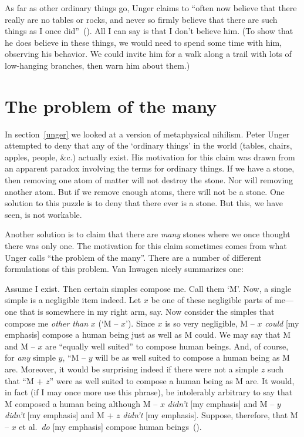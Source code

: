 \documentclass[11pt]{article}
\newenvironment{squote}{%
	\begin{spacing}{1}
	\begin{list}{}{%
	\setlength{\labelwidth}{0pt}%
	\rightmargin\leftmargin%
	}
	\item\relax
	}{%
	\end{list}%
	\end{spacing}
	}
\begin{document}
\begin{spacing}{1.5}
As far as other ordinary things go, Unger claims to ``often now believe that there really are no tables or rocks, and never so firmly believe that there are such things as I once did''~(\citeyear[543]{unger1980b}).  All I can say is that I don't believe him.  (To show that he does believe in these things, we would need to spend some time with him, observing his behavior.  We could invite him for a walk along a trail with lots of low-hanging branches, then warn him about them.)

\section{The problem of the many}
\label{many}
In section~\ref{unger} we looked at a version of metaphysical nihilism.  Peter Unger attempted to deny that any of the `ordinary things' in the world (tables, chairs, apples, people, \&c.) actually exist.  His motivation for this claim was drawn from an apparent paradox involving the terms for ordinary things.  If we have a stone, then removing one atom of matter will not destroy the stone.  Nor will removing another atom.  But if we remove enough atoms, there will not be a stone.  One solution to this puzzle is to deny that there ever is a stone.  But this, we have seen, is not workable.

Another solution is to claim that there are {\em many} stones where we once thought there was only one.  The motivation for this claim sometimes comes from what Unger calls ``the problem of the many''.  There are a number of different formulations of this problem.  Van Inwagen nicely summarizes one:
\begin{squote}
Assume I exist.  Then certain simples compose me.  Call them `M'.  Now, a single simple is a negligible item indeed.  Let $x$ be one of these negligible parts of me---one that is somewhere in my right arm, say.  Now consider the simples that compose me {\em other than} $x$ (`M -- $x$').  Since $x$ is so very negligible, M -- $x$ {\em could} [my emphasis] compose a human being just as well as M could.  We may say that M and M -- $x$ are ``equally well suited'' to compose human beings.  And, of course, for {\em any} simple $y$, ``M -- $y$ will be as well suited to compose a human being as M are.  Moreover, it would be surprising indeed if there were not a simple $z$ such that ``M + $z$'' were as well suited to compose a human being as M are.  It would, in fact (if I may once more use this phrase), be intolerably arbitrary to say that M composed a human being although M -- $x$ {\em didn't} [my emphasis] and M -- $y$ {\em didn't} [my emphasis] and M + $z$ {\em didn't} [my emphasis].  Suppose, therefore, that M -- $x$ et al.\ {\em do} [my emphasis] compose human beings~(\citeyear[215]{inwagen1995}).
\end{squote}


\end{spacing}
\end{document}
